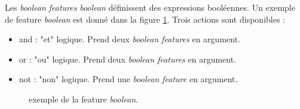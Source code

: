 \documentclass[manual-fr.tex]{subfiles}
\begin{document}
Les \textit{boolean features} \textit{boolean} définissent des expressions booléennes. Un exemple de feature \textit{boolean} est donné dans la figure \ref{fig:feature-boolean}. Trois actions sont disponibles :
\begin{itemize}
    \item and : "et" logique. Prend deux \textit{boolean features} en argument.
    \item or : "ou" logique. Prend deux \textit{boolean features} en argument.
    \item not : "non" logique. Prend une \textit{boolean feature} en argument.
\end{itemize}

\begin{figure}[ht!]
\footnotesize
\begin{xml}
\end{xml}
\caption{exemple de la feature \textit{boolean}.}
\label{fig:feature-boolean}
\end{figure}
\end{document}
